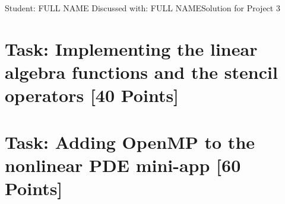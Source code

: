 \documentclass[unicode,11pt,a4paper,oneside,numbers=endperiod,openany]{scrartcl}
\begin{document}
\setassignment
{}

            {Student: FULL NAME}
            {Discussed with: FULL NAME}{Solution for Project 3}{}
\newline

\assignmentpolicy

\section{Task: Implementing the linear algebra functions and the stencil
         operators [40 Points]}

\section{Task:  Adding OpenMP to the nonlinear PDE mini-app [60 Points]}
\end{document}

